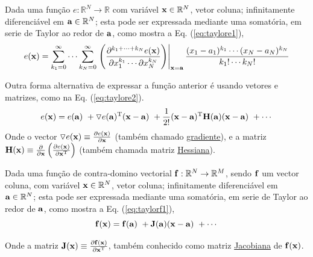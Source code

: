 \begin{proposition}\label{prop:taylore}
Dada uma função $e:\mathbb{R}^{N}\rightarrow \mathbb{R}$ com variável $\VECTOR{x} \in \mathbb{R}^{N}$, vetor coluna;
infinitamente diferenciável em $\VECTOR{a} \in \mathbb{R}^{N}$;
esta pode ser expressada mediante uma somatória, em serie de Taylor 
\cite[pp. 187, 207]{zhang2017matrix} \cite{Taylor}  ao redor de $\VECTOR{a}$, como
mostra a Eq. (\ref{eq:taylore1}),
\begin{equation}\label{eq:taylore1}
e(\VECTOR{x}) =\sum _{k_{1}=0}^{\infty }\cdots \sum _{k_{N}=0}^{\infty }\left.\left({\frac {\partial ^{k_{1}+\cdots +k_{N}}e(\VECTOR{x})}{\partial x_{1}^{k_{1}}\cdots \partial x_{N}^{k_{N}}}}\right)\right|_{\VECTOR{x}=\VECTOR{a}} {\frac {(x_{1}-a_{1})^{k_{1}}\cdots (x_{N}-a_{N})^{k_{N}}}{k_{1}!\cdots k_{N}!}}
\end{equation}

Outra forma alternativa de expressar a função anterior é usando vetores e matrizes,
como na Eq. (\ref{eq:taylore2}).
\begin{equation}\label{eq:taylore2}
  e(\VECTOR{x})=e(\VECTOR{a})
      ~+ \triangledown e(\VECTOR{a})^{\transpose} (\VECTOR{x}-\VECTOR{a})
      ~+\frac{1}{2!}(\VECTOR{x}-\VECTOR{a})^{\transpose} \MATRIX{H(\VECTOR{a})}  (\VECTOR{x}-\VECTOR{a})
      ~+\cdots 
\end{equation}
Onde o vector $\triangledown e(\VECTOR{x})\equiv \frac{\partial e(\VECTOR{x})}{\partial \VECTOR{x} }$ 
(também chamado \hyperref[def:gradient]{gradiente}),
e a matriz $\MATRIX{H}(\VECTOR{x})\equiv \frac{\partial }{\partial \VECTOR{x}} \left( \frac{\partial e(\VECTOR{x})}{ \partial \VECTOR{x}^{\transpose} }\right)$
(também chamada matriz \hyperref[def:hessian]{Hessiana}).
\end{proposition}

\begin{proposition}\label{prop:taylorf}
Dada uma função de contra-domino vectorial $\VECTOR{f}:\mathbb{R}^{N}\rightarrow \mathbb{R}^{M}$, 
sendo $\VECTOR{f}$ um vector coluna, com variável $\VECTOR{x} \in \mathbb{R}^{N}$, vetor coluna;
infinitamente diferenciável em $\VECTOR{a} \in \mathbb{R}^{N}$;
esta pode ser expressada mediante uma somatória, em serie de Taylor 
\cite[pp. 393]{levine1999control} \cite{Taylor} ao redor de $\VECTOR{a}$, como
mostra a Eq. (\ref{eq:taylorf1}),
\begin{equation}\label{eq:taylorf1}
\VECTOR{f}(\VECTOR{x}) =\VECTOR{f}(\VECTOR{a})
      ~+ \MATRIX{J}(\VECTOR{a}) (\VECTOR{x}-\VECTOR{a})
      ~+\cdots 
\end{equation}

Onde a matriz $\MATRIX{J}(\VECTOR{x})\equiv \frac{\partial \VECTOR{f}(\VECTOR{x})}{\partial \VECTOR{x}^{\transpose} }$,
também conhecido como matriz \hyperref[def:jacobian]{Jacobiana} de $\VECTOR{f}(\VECTOR{x})$.
\end{proposition}
